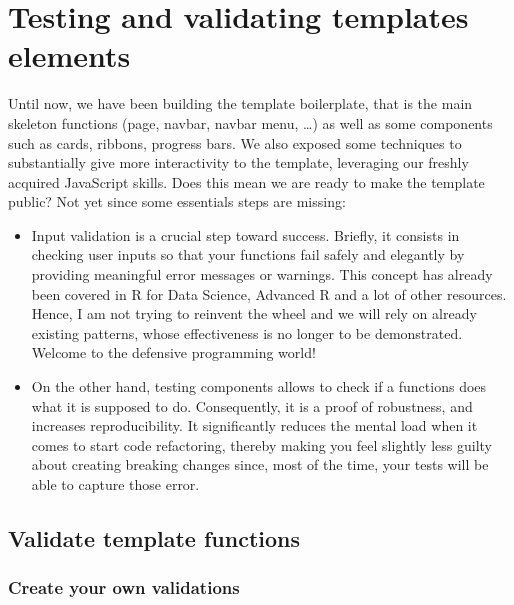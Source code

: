 \documentclass[
]{book}
\providecommand{\tightlist}{%
  \setlength{\itemsep}{0pt}\setlength{\parskip}{0pt}}
\begin{document}
\hypertarget{custom-templates-testing}{%
\chapter{Testing and validating templates elements}\label{custom-templates-testing}}

Until now, we have been building the template boilerplate, that is the main skeleton functions (page, navbar, navbar menu, \ldots) as well as some components such as cards, ribbons, progress bars. We also exposed some techniques to substantially give more interactivity to the template, leveraging our freshly acquired JavaScript skills. Does this mean we are ready to make the template public? Not yet since some essentials steps are missing:

\begin{itemize}
\tightlist
\item
  Input validation is a crucial step toward success. Briefly, it consists in checking user inputs so that your functions fail safely and elegantly by providing meaningful error messages or warnings. This concept has already been covered in R for Data Science, Advanced R and a lot of other resources. Hence, I am not trying to reinvent the wheel and we will rely on already existing patterns, whose effectiveness is no longer to be demonstrated. Welcome to the defensive programming world!
\item
  On the other hand, testing components allows to check if a functions does what it is supposed to do. Consequently, it is a proof of robustness, and increases reproducibility. It significantly reduces the mental load when it comes to start code refactoring, thereby making you feel slightly less guilty about creating breaking changes since, most of the time, your tests will be able to capture those error.
\end{itemize}

\hypertarget{validate-template-functions}{%
\section{Validate template functions}\label{validate-template-functions}}

\hypertarget{create-your-own-validations}{%
\subsection{Create your own validations}\label{create-your-own-validations}}
\end{document}
